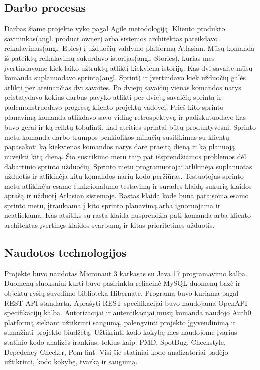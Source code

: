 \documentclass{VUMIFPSkursinis}
\begin{document}
	\subsection{Darbo procesas}
		Darbas šiame projekte vyko pagal Agile metodologiją.
		Kliento produkto savininkas(angl. product owner) arba sistemos architektas pateikdavo reikalavimus(angl. Epics) 
		į užduočių valdymo platformą Atlasian. Mūsų komanda iš pateiktų reikalavimų sukurdavo istorijas(angl. Stories),
		kurias mes įvertindavome kiek laiko užtruktų atliktį kiekvieną istoriją.
		Kas dvi savaite mūsų komanda suplanuodavo sprintą(angl. Sprint) ir įvertindavo kiek užduočių galės atlikti per ateinančias dvi savaites.
		Po dviejų savaičių vienas komandos narys pristatydavo kokius darbus pavyko atlikti per dviejų savaičių sprintą ir pademonstruodavo progresą kliento projektų vadovei.
		Prieš kito sprinto planavimą komanda atlikdavo savo vidinę retrospektyvą ir padiskutuodavo kas buvo gerai ir ką reiktų tobulinti, kad ateities sprintai būtų produktyvesni.
		Sprinto metu komanda darbo trumpos penkiolikos minučių susitikimus su klientų papasakoti ką kiekvienas komandos
		narys darė praeitą dieną ir ką planuoją nuveikti kitą dieną.
		Šio susitikimo metu taip pat išsprendžiamos problemos dėl dabartinio sprinto užduočių.
		Sprinto metu programuotojai atlikinėja suplanuotas užduotis ir atlikinėja kitų komandos narių kodo peržiūras.
		Testuotojas sprinto metu atlikinėja esamo funkcionalumo testavimą ir suradęs klaidą sukurią klaidos aprašą ir užduotį Atlasian sistemoje.
		Rastas klaida kode būna pataisoma esamo sprinto metu, įtraukiama į kito sprinto planavimą arba ignoruojama ir 
		neatliekama.
		Kas atsitiks su rasta klaida nusprendžia pati komanda arba kliento architektas įvertinęs klaidos svarbumą ir kitas prioritetines užduotis.
		
	\subsection{Naudotos technologijos}
		Projekte buvo naudotas Micronaut 3 karkasas su Java 17 programavimo kalba.
		Duomenų sluoksniui kurti buvo pasirinkta reliacinė MySQL duomenų bazė ir objektų ryšių suvedimo biblioteka Hibernate.
		Programa buvo kuriama pagal REST API standartą. Aprašyti REST specifikacijai buvo naudojama OpenAPI specifikacijų kalba.
		Autorizacijai ir autentikacijai mūsų komanda naudojo Auth0 platformą siekiant užtikrinti saugumą, palengvinti projekto įgyvendinimą ir sumažinti projekto 
		biudžetą.
		Užtikrinti kodo kokybę mes naudojome įvarius statinio kodo analizės įrankius, tokius kaip: PMD, SpotBug, Checkstyle, Depedency Checker, Pom-lint.
		Visi šie statiniai kodo analizatoriai padėjo užtikrinti, kodo kokybę, tvarką ir saugumą.
		
\end{document}
